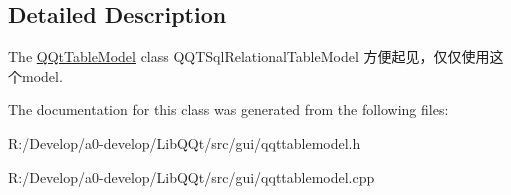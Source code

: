 \subsection{Detailed Description}
The \mbox{\hyperlink{class_q_qt_table_model}{Q\+Qt\+Table\+Model}} class Q\+Q\+T\+Sql\+Relational\+Table\+Model 方便起见，仅仅使用这个model. 

The documentation for this class was generated from the following files\+:\begin{DoxyCompactItemize}
\item 
R\+:/\+Develop/a0-\/develop/\+Lib\+Q\+Qt/src/gui/qqttablemodel.\+h\item 
R\+:/\+Develop/a0-\/develop/\+Lib\+Q\+Qt/src/gui/qqttablemodel.\+cpp\end{DoxyCompactItemize}

